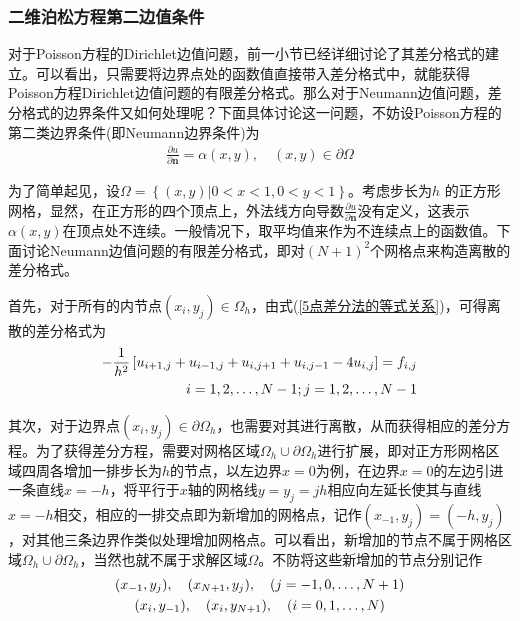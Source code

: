         \subsubsection{二维泊松方程第二边值条件}
            对于Poisson方程的Dirichlet边值问题，前一小节已经详细讨论了其差分格式的建立。可以看出，只需要将边界点处的函数值直接带入差分格式中，就能获得Poisson方程Dirichlet边值问题的有限差分格式。那么对于Neumann边值问题，差分格式的边界条件又如何处理呢？下面具体讨论这一问题，不妨设Poisson方程的第二类边界条件(即Neumann边界条件)为
            \begin{align*}
            \frac{\partial u}{\partial \mathbf{n}} = \alpha ( x,y),\quad ( x,y ) \in \partial \Omega
            \end{align*}
            \par
            为了简单起见，设$\Omega  = \left\{ {\left( {x,y} \right)\left| {0 < x < 1,0 < y < 1} \right.} \right\}$。考虑步长为$h$ 的正方形网格，显然，在正方形的四个顶点上，外法线方向导数$\frac{{\partial u}}{{\partial \mathbf{n}}} $没有定义，这表示$\alpha(x,y)$在顶点处不连续。一般情况下，取平均值来作为不连续点上的函数值。下面讨论Neumann边值问题的有限差分格式，即对$(N+1)^2$个网格点来构造离散的差分格式。
            \par
            首先，对于所有的内节点$(x_i,y_j) \in {\Omega _h}$，由式(\ref{5点差分法的等式关系})，可得离散的差分格式为
            \begin{align}\label{eq:离散差分格式}
             - \frac{1}{{{h^2}}}\left[ {{u_{i + 1,j}} + {u_{i - 1,j}} + {u_{i,j + 1}} + {u_{i,j - 1}} - 4{u_{i,j}}} \right] = {f_{i,j}}\notag\\
             i=1,2,\ldots,N-1; j=1,2,\ldots,N-1
            \end{align}
             \par
             其次，对于边界点$(x_i,y_j) \in {\partial \Omega _h}$，也需要对其进行离散，从而获得相应的差分方程。为了获得差分方程，需要对网格区域${\Omega _h}\cup {\partial \Omega _h} $进行扩展，即对正方形网格区域四周各增加一排步长为$h$的节点，以左边界$x=0$为例，在边界$x=0$的左边引进一条直线$x=-h$，将平行于$x$轴的网格线$y=y_j=jh$相应向左延长使其与直线$x=-h$相交，相应的一排交点即为新增加的网格点，记作$(x_{-1},y_j)=(-h,y_j)$，对其他三条边界作类似处理增加网格点。可以看出，新增加的节点不属于网格区域${\Omega _h}\cup {\partial \Omega _h} $，当然也就不属于求解区域$\Omega$。不防将这些新增加的节点分别记作
             \begin{gather}
             (x_{-1},y_j),\quad (x_{N+1},y_j),\quad (j=-1,0,\ldots,N+1)\notag\\
             (x_{i},y_{-1}),\quad (x_{i},y_{N+1}),\quad (i=0,1,\ldots,N)\notag
             \end{gather}
